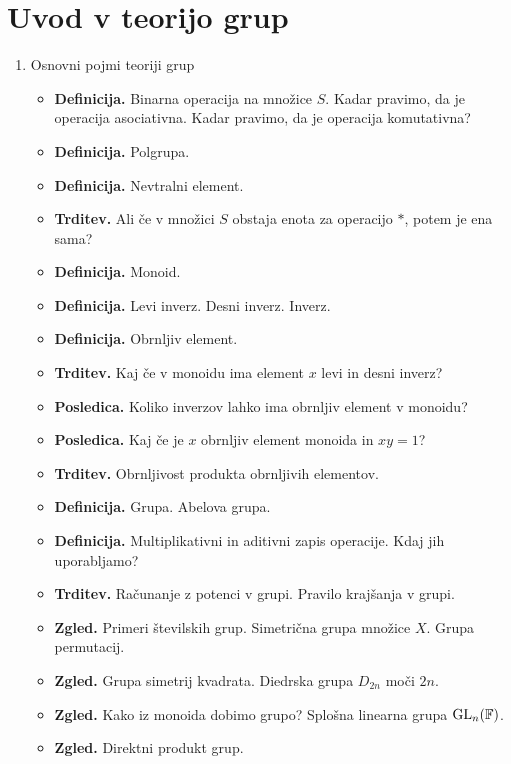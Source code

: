 \section{Uvod v teorijo grup}

\begin{enumerate}
    \item Osnovni pojmi teoriji grup
    \begin{itemize}
        \item \textbf{Definicija.} Binarna operacija na množice $S$. Kadar pravimo, da je operacija asociativna. Kadar pravimo, da je operacija komutativna?       
        \item \textbf{Definicija.} Polgrupa.
        \item \textbf{Definicija.} Nevtralni element.
        \item \textbf{Trditev.} Ali če v množici \(S\) obstaja enota za operacijo \(*\), potem je ena sama?
        \item \textbf{Definicija.} Monoid.
        \item \textbf{Definicija.} Levi inverz. Desni inverz. Inverz. 
        \item \textbf{Definicija.} Obrnljiv element.
        \item \textbf{Trditev.} Kaj če v monoidu ima element \(x\) levi in desni inverz?
        \item \textbf{Posledica.} Koliko inverzov lahko ima obrnljiv element v monoidu?
        \item \textbf{Posledica.} Kaj če je \(x\) obrnljiv element monoida in \(xy = 1\)?
        \item \textbf{Trditev.} Obrnljivost produkta obrnljivih elementov.
        \item \textbf{Definicija.} Grupa. Abelova grupa.
        \item \textbf{Definicija.} Multiplikativni in aditivni zapis operacije. Kdaj jih uporabljamo?
        \item \textbf{Trditev.} Računanje z potenci v grupi. Pravilo krajšanja v grupi.
        \item \textbf{Zgled.} Primeri številskih grup. Simetrična grupa množice \(X\). Grupa permutacij.
        \item \textbf{Zgled.} Grupa simetrij kvadrata. Diedrska grupa \(D_{2n}\) moči \(2n\).
        \item \textbf{Zgled.} Kako iz monoida dobimo grupo? Splošna linearna grupa \(\operatorname{GL}_n(\mathbb{F})\).
        \item \textbf{Zgled.} Direktni produkt grup. 
    \end{itemize}   
    

\end{enumerate}
